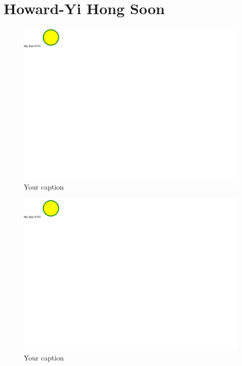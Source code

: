 \documentclass{article}
\begin{document}
\section{Howard-Yi Hong Soon}
\begin{figure}[h!]
    \centering
    \captionsetup{labelformat=empty}
    \caption{Your caption}
    \includegraphics[width=\textwidth, angle=0]{Kreis2.pdf}
\end{figure}
\newpage
\begin{figure}[h!]
    \centering
    \captionsetup{labelformat=empty}
    \caption{Your caption}
    \includegraphics[width=\textwidth, angle=0]{Kreis2.pdf}
\end{figure}
\newpage
\end{document}
